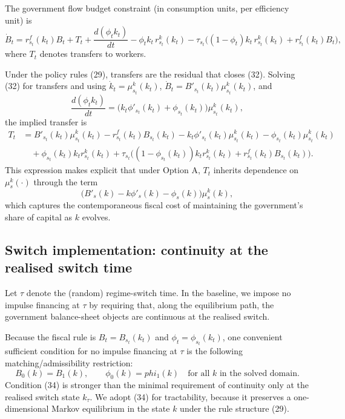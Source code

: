 \documentclass{article}
\begin{document}
The government flow budget constraint (in consumption units, per efficiency unit) is
\begin{equation}
\dot{B}_t
=
r^f_{s_t}(k_t) B_t
+ T_t
+ \frac{d(\phi_t k_t)}{dt}
- \phi_t k_t\, r^k_{s_t}(k_t)
-\tau_{s_t}\Big((1-\phi_t)k_t\, r^k_{s_t}(k_t) + r^f_{s_t}(k_t)B_t\Big),
\tag{32}
\end{equation}
where $T_t$ denotes transfers to workers.

Under the policy rules (29), transfers are the residual that closes (32). Solving (32) for transfers and using $\dot{k}_t=\mu^k_{s_t}(k_t)$, $\dot{B}_t=B'_{s_t}(k_t)\mu^k_{s_t}(k_t)$, and
\[
\frac{d(\phi_t k_t)}{dt}=\big(k_t\phi'_{s_t}(k_t)+\phi_{s_t}(k_t)\big)\mu^k_{s_t}(k_t),
\]
the implied transfer is
\begin{equation}
\begin{aligned}
T_t
&=
B'_{s_t}(k_t)\mu^k_{s_t}(k_t)
- r^f_{s_t}(k_t)B_{s_t}(k_t)
- k_t \phi'_{s_t}(k_t)\mu^k_{s_t}(k_t)
- \phi_{s_t}(k_t)\mu^k_{s_t}(k_t)
\\
&\quad
+ \phi_{s_t}(k_t)k_t r^k_{s_t}(k_t)
+ \tau_{s_t}\Big((1-\phi_{s_t}(k_t))k_t r^k_{s_t}(k_t) + r^f_{s_t}(k_t)B_{s_t}(k_t)\Big).
\end{aligned}
\tag{33}
\end{equation}
This expression makes explicit that under Option A, $T_t$ inherits dependence on $\mu^k_s(\cdot)$ through the term
\[
\big(B'_s(k)-k\phi'_s(k)-\phi_s(k)\big)\mu^k_s(k),
\]
which captures the contemporaneous fiscal cost of maintaining the government’s share of capital as $k$ evolves.

\subsection{Switch implementation: continuity at the realised switch time}
Let $\tau$ denote the (random) regime-switch time. In the baseline, we impose no impulse financing at $\tau$ by requiring that, along the equilibrium path, the government balance-sheet objects are continuous at the realised switch.

Because the fiscal rule is $B_t=B_{s_t}(k_t)$ and $\phi_t=\phi_{s_t}(k_t)$, one convenient sufficient condition for no impulse financing at $\tau$ is the following matching/admissibility restriction:
\begin{equation}
B_0(k)=B_1(k), \qquad \phi_0(k)=phi_1(k)
\quad \text{for all $k$ in the solved domain.}
\tag{34}
\end{equation}
Condition (34) is stronger than the minimal requirement of continuity only at the realised switch state $k_\tau$. We adopt (34) for tractability, because it preserves a one-dimensional Markov equilibrium in the state $k$ under the rule structure (29).
\end{document}

